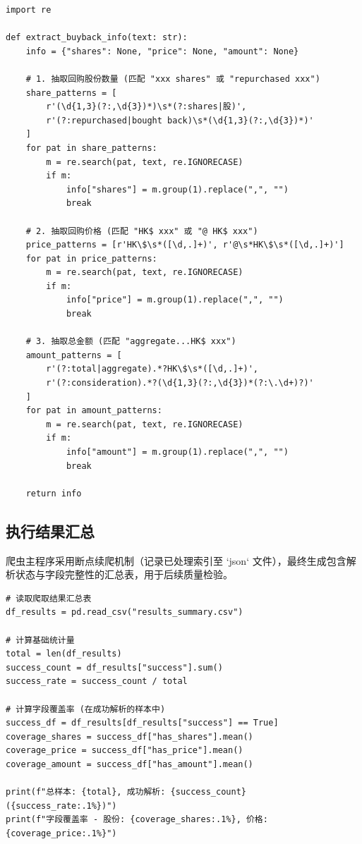 \documentclass[a4paper,10pt]{article}
\begin{document}
\begin{lstlisting}[caption={关键信息抽取逻辑}, label={code:regex}]
import re

def extract_buyback_info(text: str):
    info = {"shares": None, "price": None, "amount": None}

    # 1. 抽取回购股份数量 (匹配 "xxx shares" 或 "repurchased xxx")
    share_patterns = [
        r'(\d{1,3}(?:,\d{3})*)\s*(?:shares|股)',
        r'(?:repurchased|bought back)\s*(\d{1,3}(?:,\d{3})*)'
    ]
    for pat in share_patterns:
        m = re.search(pat, text, re.IGNORECASE)
        if m:
            info["shares"] = m.group(1).replace(",", "")
            break

    # 2. 抽取回购价格 (匹配 "HK$ xxx" 或 "@ HK$ xxx")
    price_patterns = [r'HK\$\s*([\d,.]+)', r'@\s*HK\$\s*([\d,.]+)']
    for pat in price_patterns:
        m = re.search(pat, text, re.IGNORECASE)
        if m:
            info["price"] = m.group(1).replace(",", "")
            break

    # 3. 抽取总金额 (匹配 "aggregate...HK$ xxx")
    amount_patterns = [
        r'(?:total|aggregate).*?HK\$\s*([\d,.]+)',
        r'(?:consideration).*?(\d{1,3}(?:,\d{3})*(?:\.\d+)?)'
    ]
    for pat in amount_patterns:
        m = re.search(pat, text, re.IGNORECASE)
        if m:
            info["amount"] = m.group(1).replace(",", "")
            break

    return info
\end{lstlisting}

\subsection{执行结果汇总}

爬虫主程序采用断点续爬机制（记录已处理索引至 `json` 文件），最终生成包含解析状态与字段完整性的汇总表，用于后续质量检验。

\begin{lstlisting}[caption={结果统计与质量检查}, label={code:stats}]
# 读取爬取结果汇总表
df_results = pd.read_csv("results_summary.csv")

# 计算基础统计量
total = len(df_results)
success_count = df_results["success"].sum()
success_rate = success_count / total

# 计算字段覆盖率 (在成功解析的样本中)
success_df = df_results[df_results["success"] == True]
coverage_shares = success_df["has_shares"].mean()
coverage_price = success_df["has_price"].mean()
coverage_amount = success_df["has_amount"].mean()

print(f"总样本: {total}, 成功解析: {success_count} ({success_rate:.1%})")
print(f"字段覆盖率 - 股份: {coverage_shares:.1%}, 价格: {coverage_price:.1%}")
\end{lstlisting}
\end{document}
